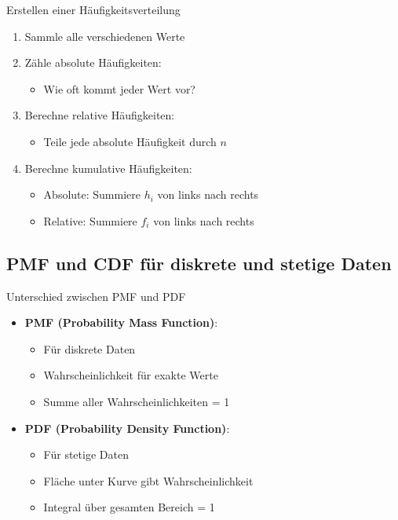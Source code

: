 \begin{KR}{Erstellen einer Häufigkeitsverteilung}
\begin{enumerate}
    \item Sammle alle verschiedenen Werte
    \item Zähle absolute Häufigkeiten:
        \begin{itemize}
            \item Wie oft kommt jeder Wert vor?
        \end{itemize}
    \item Berechne relative Häufigkeiten:
        \begin{itemize}
            \item Teile jede absolute Häufigkeit durch $n$
        \end{itemize}
    \item Berechne kumulative Häufigkeiten:
        \begin{itemize}
            \item Absolute: Summiere $h_i$ von links nach rechts
            \item Relative: Summiere $f_i$ von links nach rechts
        \end{itemize}
\end{enumerate}
\end{KR}

\subsection{PMF und CDF für diskrete und stetige Daten}

\begin{concept}{Unterschied zwischen PMF und PDF}\\
\begin{itemize}
    \item \textbf{PMF (Probability Mass Function)}:
        \begin{itemize}
            \item Für diskrete Daten
            \item Wahrscheinlichkeit für exakte Werte
            \item Summe aller Wahrscheinlichkeiten = 1
        \end{itemize}
    \item \textbf{PDF (Probability Density Function)}:
        \begin{itemize}
            \item Für stetige Daten
            \item Fläche unter Kurve gibt Wahrscheinlichkeit
            \item Integral über gesamten Bereich = 1
        \end{itemize}
\end{itemize}
\end{concept}

